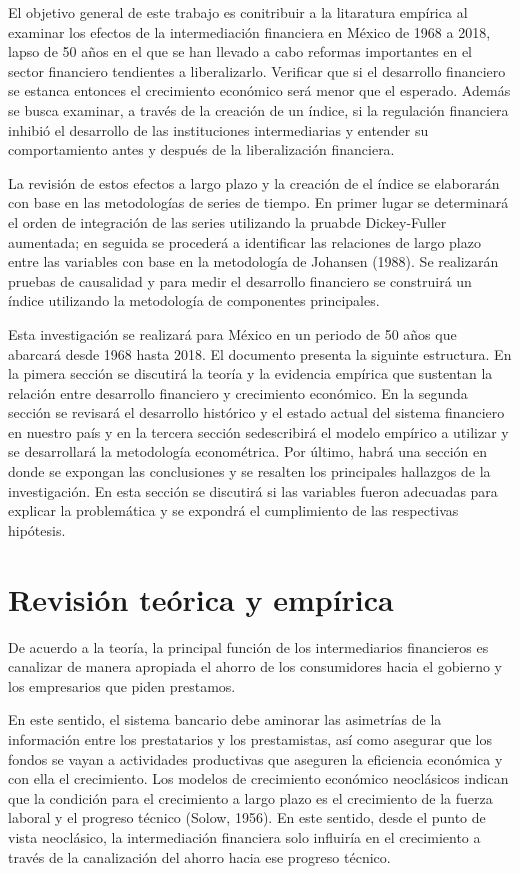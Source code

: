 \documentclass[]{AEA}
\begin{document}
El objetivo general de este trabajo es conitribuir a la litaratura
empírica al examinar los efectos de la intermediación financiera en
México de 1968 a 2018, lapso de 50 años en el que se han llevado a cabo
reformas importantes en el sector financiero tendientes a liberalizarlo.
Verificar que si el desarrollo financiero se estanca entonces el
crecimiento económico será menor que el esperado. Además se busca
examinar, a través de la creación de un índice, si la regulación
financiera inhibió el desarrollo de las instituciones intermediarias y
entender su comportamiento antes y después de la liberalización
financiera.

La revisión de estos efectos a largo plazo y la creación de el índice se
elaborarán con base en las metodologías de series de tiempo. En primer
lugar se determinará el orden de integración de las series utilizando la
pruabde Dickey-Fuller aumentada; en seguida se procederá a identificar
las relaciones de largo plazo entre las variables con base en la
metodología de Johansen (1988). Se realizarán pruebas de causalidad y
para medir el desarrollo financiero se construirá un índice utilizando
la metodología de componentes principales.

Esta investigación se realizará para México en un periodo de 50 años que
abarcará desde 1968 hasta 2018. El documento presenta la siguinte
estructura. En la pimera sección se discutirá la teoría y la evidencia
empírica que sustentan la relación entre desarrollo financiero y
crecimiento económico. En la segunda sección se revisará el desarrollo
histórico y el estado actual del sistema financiero en nuestro país y en
la tercera sección sedescribirá el modelo empírico a utilizar y se
desarrollará la metodología econométrica. Por último, habrá una sección
en donde se expongan las conclusiones y se resalten los principales
hallazgos de la investigación. En esta sección se discutirá si las
variables fueron adecuadas para explicar la problemática y se expondrá
el cumplimiento de las respectivas hipótesis.

\section{Revisión teórica y empírica}

De acuerdo a la teoría, la principal función de los intermediarios
financieros es canalizar de manera apropiada el ahorro de los
consumidores hacia el gobierno y los empresarios que piden prestamos.

En este sentido, el sistema bancario debe aminorar las asimetrías de la
información entre los prestatarios y los prestamistas, así como asegurar
que los fondos se vayan a actividades productivas que aseguren la
eficiencia económica y con ella el crecimiento. Los modelos de
crecimiento económico neoclásicos indican que la condición para el
crecimiento a largo plazo es el crecimiento de la fuerza laboral y el
progreso técnico (Solow, 1956). En este sentido, desde el punto de vista
neoclásico, la intermediación financiera solo influiría en el
crecimiento a través de la canalización del ahorro hacia ese progreso
técnico.
\end{document}
